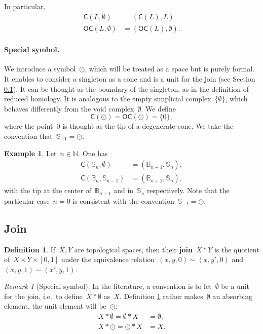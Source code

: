 \documentclass[english,11pt]{article}
\theoremstyle{plain}
\theoremstyle{remark}
\newtheorem{remark}{Remark}[section]
\theoremstyle{definition}
\newtheorem{definition}{Definition}[section]
\newtheorem{example}{Example}[section]
\newcommand{\Sp}{\mathbb{S}}
\newcommand{\BB}{\mathbb{B}}
\newcommand{\unit}{\odot}%
\newcommand{\C}[1]{\mathsf{C}(#1)}%
\newcommand{\OC}[1]{\mathsf{OC}(#1)}%
\begin{document}
In particular,
\begin{align*}
\C{L,\emptyset}&=(\C{L},L)\\
\OC{L,\emptyset}&=(\OC{L},\emptyset).
\end{align*}

\paragraph{Special symbol.}
We introduce a symbol~$\unit$, which will be treated as a space but is purely formal. It enables to consider a singleton as a cone and is a unit for the join (see Section \ref{sec_join}). It can be thought as the boundary of the singleton, as in the definition of reduced homology. It is analogous to the empty simplicial complex~$\{\emptyset\}$, which behaves differently from the void complex~$\emptyset$. We define
\begin{equation}\label{eq_unit_cone}
\C{\unit}=\OC{\unit}=\{0\},
\end{equation}
where the point~$0$ is thought as the tip of a degenerate cone. We take the convention that~$\Sp_{-1}=\unit$.

\begin{example}
Let~$n\in\mathbb{N}$. One has
\begin{align*}
\C{\Sp_{n},\emptyset}&=(\BB_{n+1},\Sp_{n}),\\
\C{\BB_{n},\Sp_{n-1}}&=(\BB_{n+1},\Sp_{n}),
\end{align*}
with the tip at the center of~$\BB_{n+1}$ and in~$\Sp_n$ respectively. Note that the particular case~$n=0$ is consistent with the convention~$\Sp_{-1}=\unit$.
\end{example}


\subsection{Join}\label{sec_join}

\begin{definition}\label{def_join}
If~$X,Y$ are topological spaces, then their \textbf{join}~$X*Y$ is the quotient of~$X\times Y\times [0,1]$ under the equivalence relation~$(x,y,0)\sim (x,y',0)$ and~$(x,y,1)\sim (x',y,1)$.
\end{definition}


\begin{remark}[Special symbol]
In the literature, a convention is to let~$\emptyset$ be a unit for the join, i.e.~to define~$X*\emptyset$ as~$X$. Definition \ref{def_join} rather makes~$\emptyset$ an absorbing element, the unit element will be~$\unit$:
\begin{align*}
 X*\emptyset=\emptyset*X&=\emptyset,\\
X*\unit=\unit*X&=X.
 \end{align*}
\end{remark}
\end{document}
